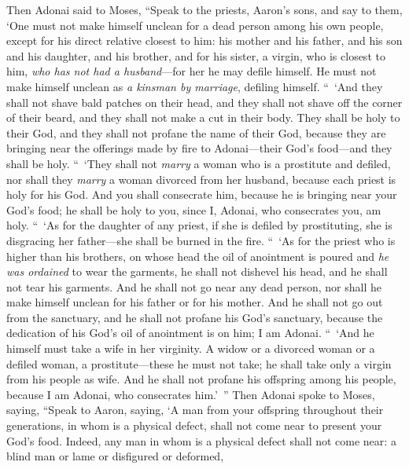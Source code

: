 \begin{biblechapter} %
 Then Adonai said to Moses, “Speak to the priests, Aaron’s sons, and say to them, ‘One must not make himself unclean for a dead person among his own people,
\verse except for his direct relative closest to him: his mother and his father, and his son and his daughter, and his brother,
\verse and for his sister, a virgin, who is closest to him, \textit{who has not had a husband}—for her he may defile himself.
\verse He must not make himself unclean as \textit{a kinsman by marriage}, defiling himself.
\verse “ ‘And they shall not shave bald patches on their head, and they shall not shave off the corner of their beard, and they shall not make a cut in their body.
\verse They shall be holy to their God, and they shall not profane the name of their God, because they are bringing near the offerings made by fire to Adonai—their God’s food—and they shall be holy.
\verse “ ‘They shall not \textit{marry} a woman who is a prostitute and defiled, nor shall they \textit{marry} a woman divorced from her husband, because each priest is holy for his God.
\verse And you shall consecrate him, because he is bringing near your God’s food; he shall be holy to you, since I, Adonai, who consecrates you, am holy.
\verse “ ‘As for the daughter of any priest, if she is defiled by prostituting, she is disgracing her father—she shall be burned in the fire.
\verse “ ‘As for the priest who is higher than his brothers, on whose head the oil of anointment is poured and \textit{he was ordained} to wear the garments, he shall not dishevel his head, and he shall not tear his garments.
\verse And he shall not go near any dead person, nor shall he make himself unclean for his father or for his mother.
\verse And he shall not go out from the sanctuary, and he shall not profane his God’s sanctuary, because the dedication of his God’s oil of anointment is on him; I am Adonai.
\verse “ ‘And he himself must take a wife in her virginity.
\verse A widow or a divorced woman or a defiled woman, a prostitute—these he must not take; he shall take only a virgin from his people as wife.
\verse And he shall not profane his offspring among his people, because I am Adonai, who consecrates him.’ ”
\verse Then Adonai spoke to Moses, saying,
\verse “Speak to Aaron, saying, ‘A man from your offspring throughout their generations, in whom is a physical defect, shall not come near to present your God’s food.
\verse Indeed, any man in whom is a physical defect shall not come near: a blind man or lame or disfigured or deformed,

\end{biblechapter}
